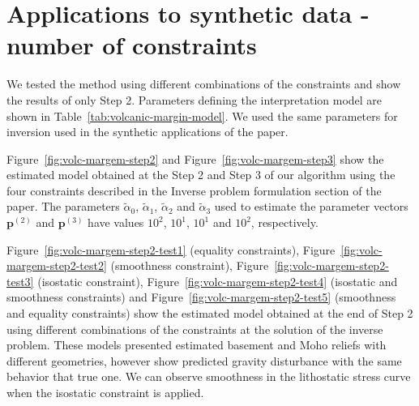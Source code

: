 \documentclass[manuscript]{geophysics}
\begin{document}
\section{Applications to synthetic data - number of constraints}

We tested the method using different combinations of the constraints and show the results of only Step 2. Parameters defining the interpretation model are shown in Table~\ref{tab:volcanic-margin-model}.  We used the same parameters for inversion used in the synthetic applications of the paper.

Figure~\ref{fig:volc-margem-step2} and Figure~\ref{fig:volc-margem-step3} show the estimated model obtained at the Step 2 and Step 3 of our algorithm using the four constraints described in the Inverse problem formulation section of the paper. The parameters $\tilde{\alpha}_{0}$, $\tilde{\alpha}_{1}$, $\tilde{\alpha}_{2}$ and $\tilde{\alpha}_{3}$ used to estimate the parameter vectors $\mathbf{p}^{(2)}$ and $\mathbf{p}^{(3)}$ have values $10^{2}$, $10^{1}$, $10^{1}$ and $10^{2}$, respectively.

Figure~\ref{fig:volc-margem-step2-test1} (equality constraints), Figure~\ref{fig:volc-margem-step2-test2} (smoothness constraint), Figure~\ref{fig:volc-margem-step2-test3} (isostatic constraint), Figure~\ref{fig:volc-margem-step2-test4} (isostatic and smoothness constraints) and Figure~\ref{fig:volc-margem-step2-test5} (smoothness and equality constraints) show the estimated model obtained at the end of Step 2 using different combinations of the constraints at the solution of the inverse problem. These models presented estimated basement and Moho reliefs with different geometries, however show predicted gravity disturbance with the same behavior that true one. We can observe smoothness in the lithostatic stress curve when the isostatic constraint is applied. 

\end{document}
